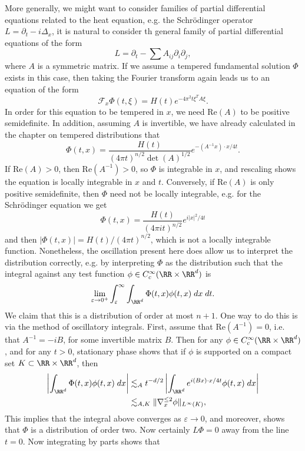 \begin{example}
    More generally, we might want to consider families of partial differential equations related to the heat equation, e.g. the Schr\"{o}dinger operator $L = \partial_t - i \Delta_x$, it is natural to consider th general family of partial differential equations of the form
    \[ L = \partial_t - \sum A_{ij} \partial_i \partial_j, \]
    where $A$ is a symmetric matrix. If we assume a tempered fundamental solution $\Phi$ exists in this case, then taking the Fourier transform again leads us to an equation of the form
    \[ \mathcal{F}_x \Phi(t,\xi) = H(t) e^{- 4 \pi^2 t \xi^T A \xi}. \]
    In order for this equation to be tempered in $x$, we need $\text{Re}(A)$ to be positive semidefinite. In addition, assuming $A$ is invertible, we have already calculated in the chapter on tempered distributions that
    \[ \Phi(t,x) = \frac{H(t)}{(4 \pi t)^{n/2} \det(A)^{1/2}} e^{- (A^{-1} x) \cdot x/4t}. \]
    If $\text{Re}(A) > 0$, then $\text{Re}(A^{-1}) > 0$, so $\Phi$ is integrable in $x$, and rescaling shows the equation is locally integrable in $x$ and $t$. Conversely, if $\text{Re}(A)$ is only positive semidefinite, then $\Phi$ need not be locally integrable, e.g. for the Schr\"{o}dinger equation we get
    \[ \Phi(t,x) = \frac{H(t)}{(4 \pi i t)^{n/2}} e^{i |x|^2 / 4t } \]
    and then $|\Phi(t,x)| = H(t) / (4 \pi t)^{n/2}$, which is not a locally integrable function. Nonetheless, the oscillation present here does allow us to interpret the distribution correctly, e.g. by interpreting $\Phi$ as the distribution such that the integral against any test function $\phi \in C_c^\infty(\RR \times \RR^d)$ is
    \[ \lim_{\varepsilon \to 0^+} \int_\varepsilon^\infty \int_{\RR^d} \Phi(t,x) \phi(t,x)\; dx\; dt. \]
    We claim that this is a distribution of order at most $n+1$. One way to do this is via the method of oscillatory integrals. First, assume that $\text{Re}(A^{-1}) = 0$, i.e. that $A^{-1} = -iB$, for some invertible matrix $B$. Then for any $\phi \in C_c^\infty(\RR \times \RR^d)$, and for any $t > 0$, stationary phase shows that if $\phi$ is supported on a compact set $K \subset \RR \times \RR^d$, then 
    \begin{align*}
        \left| \int_{\RR^d} \Phi(t,x) \phi(t,x)\; dx \right| &\lesssim_A t^{-d/2} \left| \int_{\RR^d} e^{i (Bx) \cdot x /4t} \phi(t,x)\; dx \right|\\
        &\lesssim_{A,K} \| \nabla^{\leq 2}_x \phi \|_{L^\infty(K)},
    \end{align*}
    This implies that the integral above converges as $\varepsilon \to 0$, and moreover, shows that $\Phi$ is a distribution of order two. Now certainly $L \Phi = 0$ away from the line $t = 0$. Now integrating by parts shows that

\end{example}
